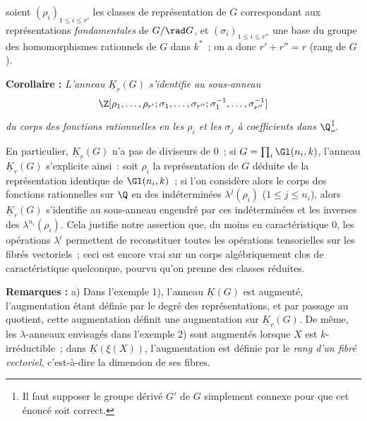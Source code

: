soient $(\rho_i)_{1\leq i\leq r'}$ les classes de représentation de $G$ correspondant aux représentations \emph{fondamentales} de $G/\rad G$, et $(\sigma_i)_{1\leq i\leq r''}$ une base du groupe des homomorphismes rationnels de $G$ dans $k^*$~; on a donc $r'+r''=r$ (rang de $G$).

\textbf{Corollaire :} \emph{L'anneau $\underline{K}_r(G)$ s'identifie au sous-anneau}
\[
\Z[\rho_1,\ldots,\rho_{r'};\sigma_1,\ldots,\sigma_{r''};\sigma_1^{-1},\ldots,\sigma_{r''}^{-1}]
\]
\emph{du corps des fonctions rationnelles en les $\rho_i$ et les $\sigma_j$ à coefficients dans $\Q$}\footnote{Il faut supposer le groupe dérivé $G'$ de $G$ simplement connexe pour que cet énoncé soit correct.}.

En particulier, $\underline{K}_r(G)$ n'a pas de diviseurs de $0$~; si $G=\prod_i\Gl(n_i,k)$, l'anneau $\underline{K}_r(G)$ s'explicite ainsi~: soit $\rho_i$ la représentation de $G$ déduite de la représentation identique de $\Gl(n_i,k)$~; si l'on considère alors le corps des fonctions rationnelles sur $\Q$ en des indéterminées $\lambda^j(\rho_i)$ ($1\leq j\leq n_i$), alors $\underline{K}_r(G)$ s'identifie au sous-anneau engendré par ces indéterminées et les inverses des $\lambda^{n_i}(\rho_i)$. Cela justifie notre assertion que, du moins en caractéristique $0$, les opérations $\lambda^i$ permettent de reconstituer toutes les opérations tensorielles sur les fibrés vectoriels~; ceci est encore vrai sur un corps algébriquement clos de caractéristique quelconque, pourvu qu'on prenne des classes réduites.

\textbf{Remarques :} a) Dans l'exemple 1), l'anneau $\underline{K}(G)$ est augmenté, l'augmentation étant définie par le degré des représentations, et par passage au quotient, cette augmentation définit une augmentation sur $\underline{K}_r(G)$. De même, les $\lambda$-anneaux envisagés dans l'exemple 2) sont augmentés lorsque $X$ est $k$-irréductible~; dans $\underline{K}(\xi(X))$, l'augmentation est définie par le \emph{rang d'un fibré vectoriel}, c'est-à-dire la dimension de ses fibres.

